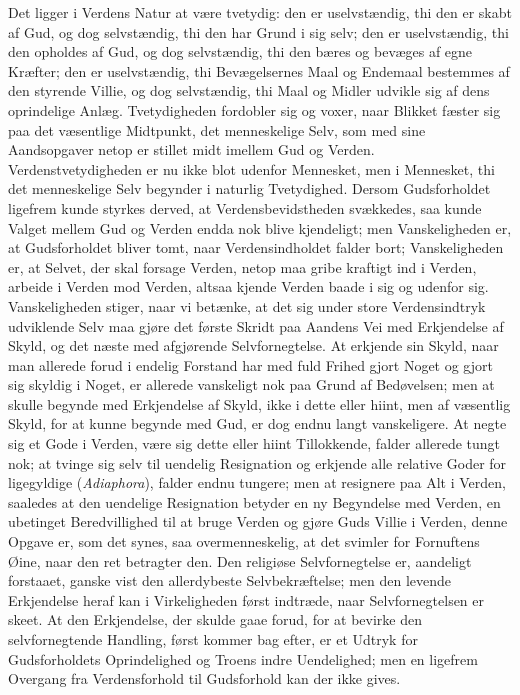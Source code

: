 \documentclass[12pt]{book}
\begin{document}
Det ligger i Verdens Natur at være tvetydig: den er uselvstændig,
thi den er skabt af Gud, og dog selvstændig, thi den har Grund i sig
selv; den er uselvstændig, thi den opholdes af Gud, og dog
selvstændig, thi den bæres og bevæges af egne Kræfter; den er
uselvstændig, thi Bevægelsernes Maal og Endemaal bestemmes af den
styrende Villie, og dog selvstændig, thi Maal og Midler udvikle sig
af dens oprindelige Anlæg. Tvetydigheden fordobler sig og voxer,
naar Blikket fæster sig paa det væsentlige Midtpunkt, det
menneskelige Selv, som med sine Aandsopgaver netop er stillet midt
imellem Gud og Verden. Verdenstvetydigheden er nu ikke blot udenfor
Mennesket, men i Mennesket, thi det menneskelige Selv begynder i
naturlig Tvetydighed. Dersom Gudsforholdet ligefrem kunde styrkes
derved, at Verdensbevidstheden svækkedes, saa kunde Valget mellem
Gud og Verden endda nok blive kjendeligt; men Vanskeligheden er, at
Gudsforholdet bliver tomt, naar Verdensindholdet falder bort;
Vanskeligheden er, at Selvet, der skal forsage Verden, netop maa
gribe kraftigt ind i Verden, arbeide i Verden mod Verden, altsaa
kjende Verden baade i sig og udenfor sig. Vanskeligheden stiger,
naar vi betænke, at
det sig under store Verdensindtryk udviklende Selv maa gjøre det
første Skridt paa Aandens Vei med Erkjendelse af Skyld, og det næste
med afgjørende Selvfornegtelse. At erkjende sin Skyld, naar man
allerede forud i endelig Forstand har med fuld Frihed gjort Noget og
gjort sig skyldig i Noget, er allerede vanskeligt nok paa Grund af
Bedøvelsen; men at skulle begynde med Erkjendelse af Skyld, ikke i
dette eller hiint, men af væsentlig Skyld, for at kunne begynde med
Gud, er dog endnu langt vanskeligere. At negte sig et Gode i Verden,
være sig dette eller hiint Tillokkende, falder allerede tungt nok;
at tvinge sig selv til uendelig Resignation og erkjende alle
relative Goder for ligegyldige (\textit{Adiaphora}), falder endnu
tungere; men at resignere paa Alt i Verden, saaledes at den
uendelige Resignation betyder en ny Begyndelse med Verden, en
ubetinget Beredvillighed til at bruge Verden og gjøre Guds Villie i
Verden, denne Opgave er, som det synes, saa overmenneskelig, at det
svimler for Fornuftens Øine, naar den ret betragter den. Den
religiøse Selvfornegtelse er, aandeligt forstaaet, ganske vist den
allerdybeste Selvbekræftelse; men den levende Erkjendelse heraf kan
i Virkeligheden først indtræde, naar Selvfornegtelsen er skeet. At
den Erkjendelse, der skulde gaae forud, for at bevirke den
selvfornegtende Handling, først kommer bag efter, er et Udtryk for
Gudsforholdets Oprindelighed og Troens indre Uendelighed; men en
ligefrem Overgang fra Verdensforhold til Gudsforhold kan der ikke
gives.
\end{document}
